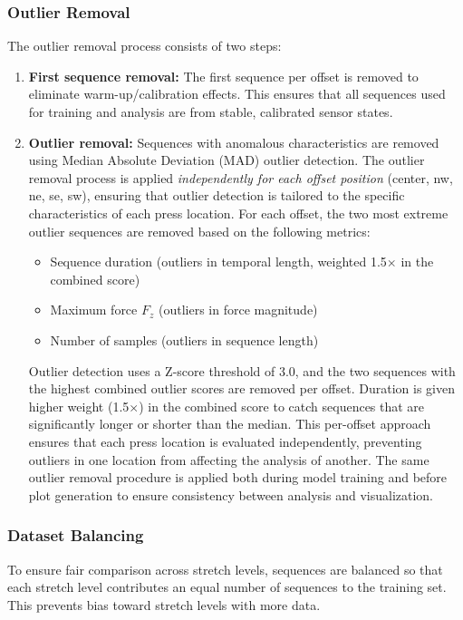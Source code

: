 \documentclass[11pt,a4paper]{article}
\begin{document}
\subsubsection{Outlier Removal}
The outlier removal process consists of two steps:
\begin{enumerate}[leftmargin=1.5em]
    \item \textbf{First sequence removal:} The first sequence per offset is removed to eliminate warm-up/calibration effects. This ensures that all sequences used for training and analysis are from stable, calibrated sensor states.
    \item \textbf{Outlier removal:} Sequences with anomalous characteristics are removed using Median Absolute Deviation (MAD) outlier detection. The outlier removal process is applied \emph{independently for each offset position} (center, nw, ne, se, sw), ensuring that outlier detection is tailored to the specific characteristics of each press location. For each offset, the two most extreme outlier sequences are removed based on the following metrics:
          \begin{itemize}[leftmargin=1.5em]
              \item Sequence duration (outliers in temporal length, weighted 1.5\(\times\) in the combined score)
              \item Maximum force \(F_z\) (outliers in force magnitude)
              \item Number of samples (outliers in sequence length)
          \end{itemize}
          Outlier detection uses a Z-score threshold of 3.0, and the two sequences with the highest combined outlier scores are removed per offset. Duration is given higher weight (1.5\(\times\)) in the combined score to catch sequences that are significantly longer or shorter than the median. This per-offset approach ensures that each press location is evaluated independently, preventing outliers in one location from affecting the analysis of another. The same outlier removal procedure is applied both during model training and before plot generation to ensure consistency between analysis and visualization.
\end{enumerate}

\subsubsection{Dataset Balancing}
To ensure fair comparison across stretch levels, sequences are balanced so that each stretch level contributes an equal number of sequences to the training set. This prevents bias toward stretch levels with more data.
\end{document}
